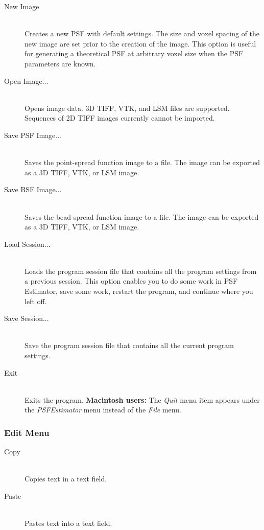 \documentclass[11pt,titlepage,twoside]{article}
\begin{document}
\begin{description}
  \item[New Image] \hfill \\
  Creates a new PSF with default settings. The size and voxel spacing of the new image are set prior to the creation of the image. This option is useful for generating a theoretical PSF at arbitrary voxel size when the PSF parameters are known.

  \item[Open Image...] \hfill \\
  Opens image data. 3D TIFF, VTK, and LSM files are supported. Sequences of 2D TIFF images currently cannot be imported.

  \item[Save PSF Image...] \hfill \\
   Saves the point-spread function image to a file. The image can be exported as a 3D TIFF, VTK, or LSM image.
   
  \item[Save BSF Image...] \hfill \\
  Saves the bead-spread function image to a file. The image can be exported as a 3D TIFF, VTK, or LSM image.
  
  \item[Load Session...] \hfill \\
  Loads the program session file that contains all the program settings from a previous session. This option enables you to do some work in PSF Estimator, save some work, restart the program, and continue where you left off.
  
  \item[Save Session...] \hfill \\
  Save the program session file that contains all the current program settings.
  
  \item[Exit] \hfill \\
  Exits the program. \textbf{Macintosh users:} The \emph{Quit} menu item appears under the \emph{PSFEstimator} menu instead of the \emph{File} menu.

\end{description}
\subsubsection{Edit Menu}

\begin{description}

  \item[Copy] \hfill \\
  Copies text in a text field.
  
  \item[Paste] \hfill \\
  Pastes text into a text field.
  
\end{description}
\end{document}
